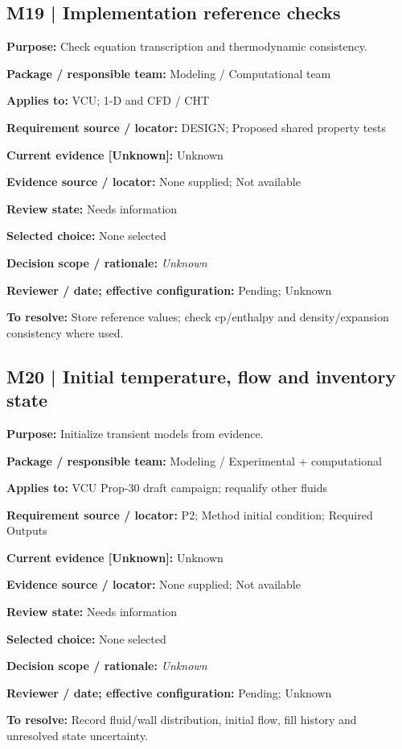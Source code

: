 \documentclass[11pt]{article}
\begin{document}
\begin{minipage}{\textwidth}\small\setlength{\parskip}{2pt}
\subsection*{M19 | Implementation reference checks}
\textbf{Purpose:} Check equation transcription and thermodynamic consistency.\par
\textbf{Package / responsible team:} Modeling / Computational team\par
\textbf{Applies to:} VCU; 1-D and CFD / CHT\par
\textbf{Requirement source / locator:} DESIGN; Proposed shared property tests\par
\textbf{Current evidence [Unknown]:} Unknown\par
\textbf{Evidence source / locator:} None supplied; Not available\par
\textbf{Review state:} Needs information\par
\textbf{Selected choice:} None selected\par
\textbf{Decision scope / rationale:} \textit{Unknown}\par
\textbf{Reviewer / date; effective configuration:} Pending; Unknown\par
\textbf{To resolve:} Store reference values; check cp/enthalpy and density/expansion consistency where used.\par
\end{minipage}\par\vspace{5pt}
\begin{minipage}{\textwidth}\small\setlength{\parskip}{2pt}
\subsection*{M20 | Initial temperature, flow and inventory state}
\textbf{Purpose:} Initialize transient models from evidence.\par
\textbf{Package / responsible team:} Modeling / Experimental + computational\par
\textbf{Applies to:} VCU Prop-30 draft campaign; requalify other fluids\par
\textbf{Requirement source / locator:} P2; Method initial condition; Required Outputs\par
\textbf{Current evidence [Unknown]:} Unknown\par
\textbf{Evidence source / locator:} None supplied; Not available\par
\textbf{Review state:} Needs information\par
\textbf{Selected choice:} None selected\par
\textbf{Decision scope / rationale:} \textit{Unknown}\par
\textbf{Reviewer / date; effective configuration:} Pending; Unknown\par
\textbf{To resolve:} Record fluid/wall distribution, initial flow, fill history and unresolved state uncertainty.\par
\end{minipage}\par\vspace{5pt}
\end{document}
